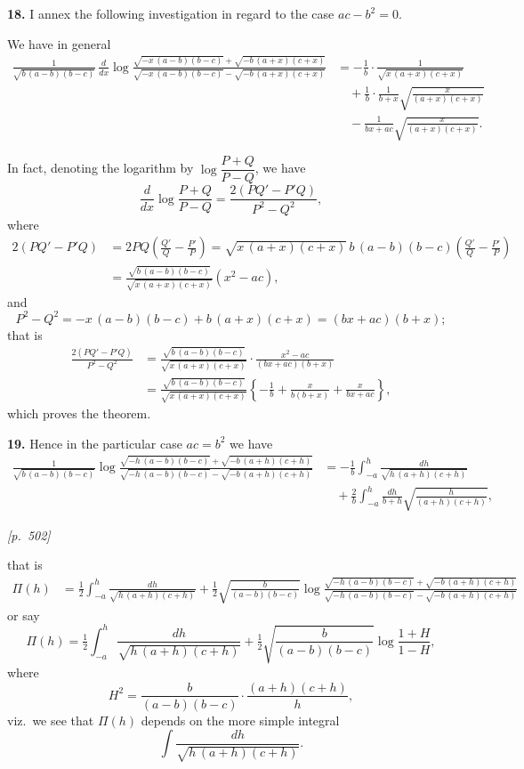 \documentclass[11pt]{article}
\begin{document}
\medskip

\textbf{18.} I annex the following investigation in regard to the case
$ac-b^{2}=0$.

We have in general
\begin{align*}
\frac{1}{\sqrt{b\,(a-b)(b-c)}}\,\frac{d}{dx}\log
\frac{\sqrt{-x\,(a-b)(b-c)}+\sqrt{-b\,(a+x)(c+x)}}
{\sqrt{-x\,(a-b)(b-c)}-\sqrt{-b\,(a+x)(c+x)}}
&= -\frac{1}{b}\cdot\frac{1}{\sqrt{x\,(a+x)(c+x)}}\\
&\quad +\frac{1}{b}\cdot\frac{1}{b+x}\sqrt{\frac{x}{(a+x)(c+x)}}\\
&\quad -\frac{1}{bx+ac}\sqrt{\frac{x}{(a+x)(c+x)}}.
\end{align*}

In fact, denoting the logarithm by $\log\dfrac{P+Q}{P-Q}$, we have
\[
\frac{d}{dx}\log\frac{P+Q}{P-Q}=\frac{2(PQ'-P'Q)}{P^{2}-Q^{2}},
\]
where
\begin{align*}
2(PQ'-P'Q) &= 2PQ\!\left(\frac{Q'}{Q}-\frac{P'}{P}\right)
=\sqrt{x\,(a+x)(c+x)}\,b\,(a-b)(b-c)\!\left(\frac{Q'}{Q}-\frac{P'}{P}\right)\\
&= \frac{\sqrt{b\,(a-b)(b-c)}}{\sqrt{x\,(a+x)(c+x)}}(x^{2}-ac),
\end{align*}
and
\[
P^{2}-Q^{2}=-x\,(a-b)(b-c)+b\,(a+x)(c+x)=(bx+ac)(b+x);
\]
that is
\begin{align*}
\frac{2(PQ'-P'Q)}{P^{2}-Q^{2}}
&= \frac{\sqrt{b\,(a-b)(b-c)}}{\sqrt{x\,(a+x)(c+x)}}\cdot\frac{x^{2}-ac}{(bx+ac)(b+x)}\\
&= \frac{\sqrt{b\,(a-b)(b-c)}}{\sqrt{x\,(a+x)(c+x)}}\left\{-\frac{1}{b}+\frac{x}{b(b+x)}+\frac{x}{bx+ac}\right\},
\end{align*}
which proves the theorem.

\textbf{19.} Hence in the particular case $ac=b^{2}$ we have
\begin{align*}
\frac{1}{\sqrt{b\,(a-b)(b-c)}}\log
\frac{\sqrt{-h\,(a-b)(b-c)}+\sqrt{-b\,(a+h)(c+h)}}
{\sqrt{-h\,(a-b)(b-c)}-\sqrt{-b\,(a+h)(c+h)}}
&= -\frac{1}{b}\int_{-a}^{h}\frac{dh}{\sqrt{h\,(a+h)(c+h)}}\\
&\quad +\frac{2}{b}\int_{-a}^{h}\frac{dh}{b+h}\sqrt{\frac{h}{(a+h)(c+h)}},
\end{align*}

\medskip

\noindent\textit{[p.~502]}

\medskip

\noindent
that is
\begin{align*}
\Pi(h) &= \tfrac{1}{2}\int_{-a}^{h}\frac{dh}{\sqrt{h\,(a+h)(c+h)}}
+\tfrac{1}{2}\sqrt{\frac{b}{(a-b)(b-c)}}
\log\frac{\sqrt{-h\,(a-b)(b-c)}+\sqrt{-b\,(a+h)(c+h)}}
{\sqrt{-h\,(a-b)(b-c)}-\sqrt{-b\,(a+h)(c+h)}}
\end{align*}
or say
\[
\Pi(h)=\tfrac{1}{2}\int_{-a}^{h}\frac{dh}{\sqrt{h\,(a+h)(c+h)}}
+\tfrac{1}{2}\sqrt{\frac{b}{(a-b)(b-c)}}\log\frac{1+H}{1-H},
\]
where
\[
H^{2}=\frac{b}{(a-b)(b-c)}\cdot\frac{(a+h)(c+h)}{h},
\]
viz.\ we see that $\Pi(h)$ depends on the more simple integral
\[
\int\frac{dh}{\sqrt{h\,(a+h)(c+h)}}.
\]
\end{document}

